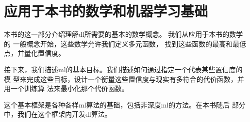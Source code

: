 
\part{应用于本书的数学和机器学习基础}
\label{part_basics}

本书的这一部分介绍理解\gls*{dl}所需要的基本的数学概念。
我们从应用于本书的数学的 一般概念开始，这些数学允许我们定义多元函数，
找到这些函数的最高和最低点，并量化置信度。

接下来，我们描述\gls*{ml}的基本目标。我们描述如何通过指定一个代表某些置信度的模
型来完成这些目标，设计一个衡量这些置信度与现实有多符合的代价函数，并用一个训练算
法来最小化那个代价函数。

这个基本框架是各种各样\gls*{ml}算法的基础，包括非深度\gls*{ml}的方法。在本书随后
部分中，我们在这个框架内开发\gls*{dl}算法。
